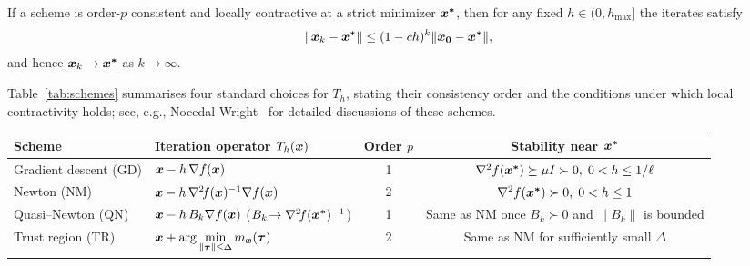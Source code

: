 \documentclass[10pt]{article}
\begin{document}
        \medskip 
            
        If a scheme is order-$p$ consistent and locally contractive at a strict
        minimizer $\bm{x^*}$, then for any fixed $h\in(0,h_{\max}]$
        the iterates satisfy
        $$
            \|\bm{x}_{k}-\bm{x^*}\|\le(1-ch)^{k}\|\bm{x_0}-\bm{x^*}\|,
        $$
        and hence $\bm{x}_{k}\to\bm{x^*}$ as $k\to\infty$.

        \medskip

        Table~\ref{tab:schemes} summarises four standard choices for $T_{h}$,
        stating their consistency order and the conditions under which local 
        contractivity holds; see, e.g., Nocedal-Wright~\cite{NocedalAndWright06}
        for detailed discussions of these schemes.

        \medskip
        
        \begin{minipage}{0.8\textwidth}
        \centering
        \begin{tabular}{@{}l l c c@{}}
            \toprule
            \textbf{Scheme} & 
            \textbf{Iteration operator $T_{h}(\bm{x})$} & 
            \textbf{Order $p$} & 
            \textbf{Stability near $\bm{x^*}$} \\ \midrule
            Gradient descent (GD) &
            $\bm{x}-h\,\nabla f(\bm{x})$ &
            1 &
            $\nabla^{2}f(\bm{x^*})\succeq \mu I\succ0,\; 0<h\le 1/\ell$ \\[3pt]

            Newton (NM) &
            $\bm{x}-h\,\nabla^{2}\!f(\bm{x})^{-1}\nabla f(\bm{x})$ &
            2 &
            $\nabla^{2}f(\bm{x^*})\succ0,\; 0<h\le 1$ \\[3pt]

            Quasi–Newton (QN) &
            $\bm{x}-h\,B_{k}\nabla f(\bm{x})$ \quad
            ($B_{k}\!\to\nabla^{2}\!f(\bm{x^*})^{-1}$) &
            1 &
            Same as NM once $B_{k}\succ0$ and $\|B_{k}\|$ is bounded \\[3pt]

            Trust region (TR) &
            $\displaystyle
            \bm{x}+\arg\min_{\|\bm{\tau}\|\le\Delta}
            m_{\bm{x}}(\bm{\tau})$ &
            2 &
            Same as NM for sufficiently small $\Delta$ \\ \bottomrule
        \end{tabular}
        \label{tab:schemes}
        \end{minipage} 
        
\end{document}
